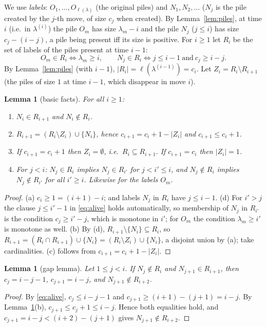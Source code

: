 \documentclass[11pt]{article}
\newtheorem{lemma}[theorem]{Lemma}
\theoremstyle{definition}
\newcommand{\R}{R}
\renewcommand{\le}{\leqslant}
\renewcommand{\ge}{\geqslant}
\begin{document}
We use \emph{labels}: $O_1,\dots,O_{\ell(\lambda)}$ (the original piles) and $N_1,N_2,\dots$ ($N_j$ is the pile
created by the $j$-th move, of size $c_j$ when created).  By Lemma~\ref{lem:piles}, at time $i$ (i.e.\ in
$\lambda^{(i)}$) the pile $O_m$ has size $\lambda_m-i$ and the pile $N_j$ ($j\le i$) has size $c_j-(i-j)$, a pile
being present iff its size is positive.  For $i\ge1$ let $\R_i$ be the set of labels of the piles present
at time $i-1$:
\begin{equation}\label{eq:alive}
O_m\in \R_i\iff\lambda_m\ge i,\qquad N_j\in \R_i\iff j\le i-1\ \text{and}\ c_j\ge i-j .
\end{equation}
By Lemma~\ref{lem:piles} (with $i-1$), $|\R_i|=\ell(\lambda^{(i-1)})=c_i$.  Let $Z_i=\R_i\setminus \R_{i+1}$ (the piles
of size $1$ at time $i-1$, which disappear in move $i$).

\begin{lemma}[basic facts]\label{lem:basic}
For all $i\ge1$:
\begin{enumerate}
\item[(a)] $N_i\in \R_{i+1}$ and $N_i\notin \R_i$.
\item[(b)] $\R_{i+1}=(\R_i\setminus Z_i)\cup\{N_i\}$, hence $c_{i+1}=c_i+1-|Z_i|$ and $c_{i+1}\le c_i+1$.
\item[(c)] If $c_{i+1}=c_i+1$ then $Z_i=\emptyset$, i.e.\ $\R_i\subseteq \R_{i+1}$.  If $c_{i+1}=c_i$ then $|Z_i|=1$.
\item[(d)] For $j<i$: $N_j\in \R_i$ implies $N_j\in \R_{i'}$ for $j<i'\le i$, and $N_j\notin \R_i$ implies
$N_j\notin \R_{i'}$ for all $i'\ge i$.  Likewise for the labels $O_m$.
\end{enumerate}
\end{lemma}
\begin{proof}
(a) $c_i\ge1=(i+1)-i$; and labels $N_j$ in $\R_i$ have $j\le i-1$.  (d) For $i'>j$ the clause $j\le i'-1$ in
\eqref{eq:alive} holds automatically, so membership of $N_j$ in $\R_{i'}$ is the condition $c_j\ge i'-j$, which
is monotone in $i'$; for $O_m$ the condition $\lambda_m\ge i'$ is monotone as well.  (b) By (d), $\R_{i+1}\setminus\{N_i\}\subseteq \R_i$, so
$\R_{i+1}=(\R_i\cap \R_{i+1})\cup\{N_i\}=(\R_i\setminus Z_i)\cup\{N_i\}$, a disjoint union by (a); take cardinalities.
(c) follows from $c_{i+1}=c_i+1-|Z_i|$.
\end{proof}

\begin{lemma}[gap lemma]\label{lem:gap}
Let $1\le j<i$.  If $N_j\notin \R_i$ and $N_{j+1}\in \R_{i+1}$, then $c_j=i-j-1$, $c_{j+1}=i-j$, and
$N_{j+1}\notin \R_{i+2}$.
\end{lemma}
\begin{proof}
By \eqref{eq:alive}, $c_j\le i-j-1$ and $c_{j+1}\ge (i+1)-(j+1)=i-j$.  By Lemma~\ref{lem:basic}(b),
$c_{j+1}\le c_j+1\le i-j$.  Hence both equalities hold, and $c_{j+1}=i-j<(i+2)-(j+1)$ gives
$N_{j+1}\notin \R_{i+2}$.
\end{proof}
\end{document}
